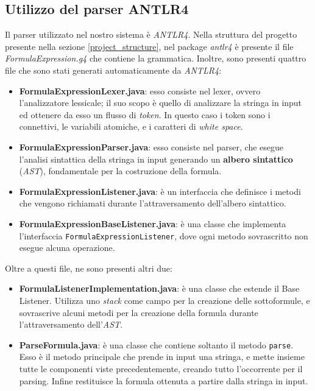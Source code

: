 \documentclass[a4paper,12pt]{report}
\begin{document}
\subsection{Utilizzo del parser ANTLR4}
Il parser utilizzato nel nostro sistema è \emph{ANTLR4}. Nella struttura del progetto presente nella sezione \ref{project_structure}, nel package \emph{antlr4} è presente il file \emph{FormulaExpression.g4} che contiene la grammatica. Inoltre, sono presenti quattro file che sono stati generati automaticamente da \emph{ANTLR4}:
\begin{itemize}
    \item \textbf{FormulaExpressionLexer.java}:
    esso consiste nel lexer, ovvero l'analizzatore lessicale; il suo scopo è quello di analizzare la stringa in input ed ottenere da esso un flusso di \emph{token}. In questo caso i token sono i connettivi, le variabili atomiche, e i caratteri di \emph{white space}.
    \item \textbf{FormulaExpressionParser.java}:
    esso consiste nel parser, che esegue l'analisi sintattica della stringa in input generando un \textbf{albero sintattico} (\emph{AST}), fondamentale per la costruzione della formula.
    \item \textbf{FormulaExpressionListener.java}:
    è un interfaccia che definisce i metodi che vengono richiamati durante l'attraversamento dell'albero sintattico.
    \item \textbf{FormulaExpressionBaseListener.java}:
    è una classe che implementa l'interfaccia \texttt{FormulaExpressionListener}, dove ogni metodo sovrascritto non esegue alcuna operazione.
\end{itemize}

Oltre a questi file, ne sono presenti altri due:
\begin{itemize}
    \item \textbf{FormulaListenerImplementation.java}:
    è una classe che estende il Base Listener. Utilizza uno \emph{stack} come campo per la creazione delle sottoformule, e sovrascrive alcuni metodi per la creazione della formula durante l'attraversamento dell'\emph{AST}.
    \item \textbf{ParseFormula.java}:
    è una classe che contiene soltanto il metodo \texttt{parse}. Esso è il metodo principale che prende in input una stringa, e mette insieme tutte le componenti viste precedentemente, creando tutto l'occorrente per il parsing. Infine restituisce la formula ottenuta a partire dalla stringa in input.
\end{itemize}
\end{document}
